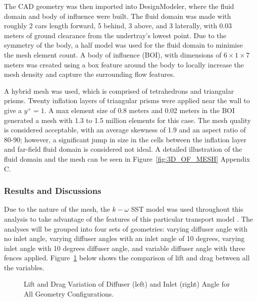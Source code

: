 \noindent The CAD geometry was then imported into DesignModeler, where the fluid domain and body of influence were built. The fluid domain was made with roughly 2 cars length forward, 5 behind, 3 above, and 3 laterally, with 0.03 meters of ground clearance from the undertray's lowest point. Due to the symmetry of the body, a half model was used for the fluid domain to minimise the mesh element count. A body of influence (BOI), with dimensions of  $6 \times 1 \times 7$ meters was created using a box feature around the body to locally increase the mesh density and capture the surrounding flow features.

\noindent A hybrid mesh was used, which is comprised of tetrahedrons and triangular prisms. Twenty inflation layers of triangular prisms were applied near the wall to give a $y^+=1$. A max element size of 0.8 meters and 0.02 meters in the BOI generated a mesh with 1.3 to 1.5 million elements for this case. The mesh quality is considered acceptable, with an average skewness of 1.9 and an aspect ratio of 80-90; however, a significant jump in size in the cells between the inflation layer and far-field fluid domain is considered not ideal. A detailed illustration of the fluid domain and the mesh can be seen in Figure~\ref{fig:3D_OF_MESH} Appendix C.

\subsubsection{Results and Discussions}
Due to the nature of the mesh, the $k-\omega$ SST model was used throughout this analysis to take advantage of the features of this particular transport model \cite{Ansys2006ModelingFlows}. The analyses will be grouped into four sets of geometries: varying diffuser angle with no inlet angle, varying diffuser angles with an inlet angle of 10 degrees, varying inlet angle with 10 degrees diffuser angle, and variable diffuser angle with three fences applied. Figure~\ref{fig:3D_OF_PLOT_COMPARE_ALL} below shows the comparison of lift and drag between all the variables.

\begin{figure}[htb!]
    \centering
    \noindent{}
    \caption{Lift and Drag Variation of Diffuser (left) and Inlet (right) Angle for All Geometry Configurations.}
    \label{fig:3D_OF_PLOT_COMPARE_ALL}
\end{figure}


